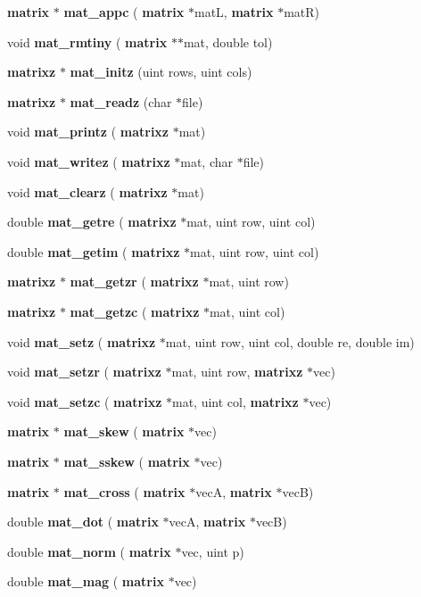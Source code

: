 \begin{DoxyCompactItemize}
\item 
\textbf{ matrix} $\ast$ \textbf{ mat\+\_\+appc} (\textbf{ matrix} $\ast$matL, \textbf{ matrix} $\ast$matR)
\item 
void \textbf{ mat\+\_\+rmtiny} (\textbf{ matrix} $\ast$$\ast$mat, double tol)
\item 
\textbf{ matrixz} $\ast$ \textbf{ mat\+\_\+initz} (uint rows, uint cols)
\item 
\textbf{ matrixz} $\ast$ \textbf{ mat\+\_\+readz} (char $\ast$file)
\item 
void \textbf{ mat\+\_\+printz} (\textbf{ matrixz} $\ast$mat)
\item 
void \textbf{ mat\+\_\+writez} (\textbf{ matrixz} $\ast$mat, char $\ast$file)
\item 
void \textbf{ mat\+\_\+clearz} (\textbf{ matrixz} $\ast$mat)
\item 
double \textbf{ mat\+\_\+getre} (\textbf{ matrixz} $\ast$mat, uint row, uint col)
\item 
double \textbf{ mat\+\_\+getim} (\textbf{ matrixz} $\ast$mat, uint row, uint col)
\item 
\textbf{ matrixz} $\ast$ \textbf{ mat\+\_\+getzr} (\textbf{ matrixz} $\ast$mat, uint row)
\item 
\textbf{ matrixz} $\ast$ \textbf{ mat\+\_\+getzc} (\textbf{ matrixz} $\ast$mat, uint col)
\item 
void \textbf{ mat\+\_\+setz} (\textbf{ matrixz} $\ast$mat, uint row, uint col, double re, double im)
\item 
void \textbf{ mat\+\_\+setzr} (\textbf{ matrixz} $\ast$mat, uint row, \textbf{ matrixz} $\ast$vec)
\item 
void \textbf{ mat\+\_\+setzc} (\textbf{ matrixz} $\ast$mat, uint col, \textbf{ matrixz} $\ast$vec)
\item 
\textbf{ matrix} $\ast$ \textbf{ mat\+\_\+skew} (\textbf{ matrix} $\ast$vec)
\item 
\textbf{ matrix} $\ast$ \textbf{ mat\+\_\+sskew} (\textbf{ matrix} $\ast$vec)
\item 
\textbf{ matrix} $\ast$ \textbf{ mat\+\_\+cross} (\textbf{ matrix} $\ast$vecA, \textbf{ matrix} $\ast$vecB)
\item 
double \textbf{ mat\+\_\+dot} (\textbf{ matrix} $\ast$vecA, \textbf{ matrix} $\ast$vecB)
\item 
double \textbf{ mat\+\_\+norm} (\textbf{ matrix} $\ast$vec, uint p)
\item 
double \textbf{ mat\+\_\+mag} (\textbf{ matrix} $\ast$vec)
\item 
$$
\end{DoxyCompactItemize}
